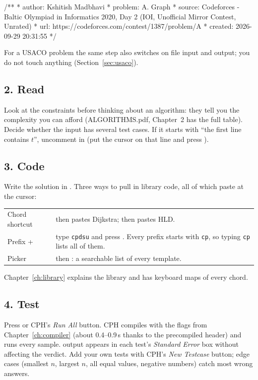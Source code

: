 \begin{code}
/**
 *    author:  Kshitish Madbhavi
 *    problem: A. Graph
 *    source:  Codeforces - Baltic Olympiad in Informatics 2020, Day 2 (IOI, Unofficial Mirror Contest, Unrated)
 *    url:     https://codeforces.com/contest/1387/problem/A
 *    created: 2026-09-29 20:31:55
 */
\end{code}

For a USACO problem the same step also switches on file input and output; you do not touch anything
(Section~\ref{sec:usaco}).

\subsection{2. Read}
Look at the constraints before thinking about an algorithm: they tell you the complexity you can afford
(ALGORITHMS.pdf, Chapter~2 has the full table). Decide whether the input has several test cases. If it starts
with ``the first line contains $t$'', uncomment  in  (put the cursor on that line and press
).

\subsection{3. Code}
Write the solution in . Three ways to pull in library code, all of which paste at the cursor:

\begin{center}
\begin{tabularx}{\linewidth}{p{4.3cm}L}
\toprule
{} &  \\
\midrule
Chord shortcut &  then  pastes Dijkstra;  then  pastes HLD. \\
Prefix +  & type \texttt{cpdsu} and press . Every prefix starts with \texttt{cp}, so typing \texttt{cp} lists all of them. \\
Picker &  then : a searchable list of every template. \\
\bottomrule
\end{tabularx}
\end{center}

Chapter~\ref{ch:library} explains the library and has keyboard maps of every chord.

\subsection{4. Test}
Press  or CPH's \emph{Run All} button. CPH compiles with the flags from Chapter~\ref{ch:compiler}
(about 0.4--0.9\,s thanks to the precompiled header) and runs every sample.  output appears in each test's
\emph{Standard Error} box without affecting the verdict. Add your own tests with CPH's \emph{New Testcase} button;
edge cases (smallest $n$, largest $n$, all equal values, negative numbers) catch most wrong answers.

